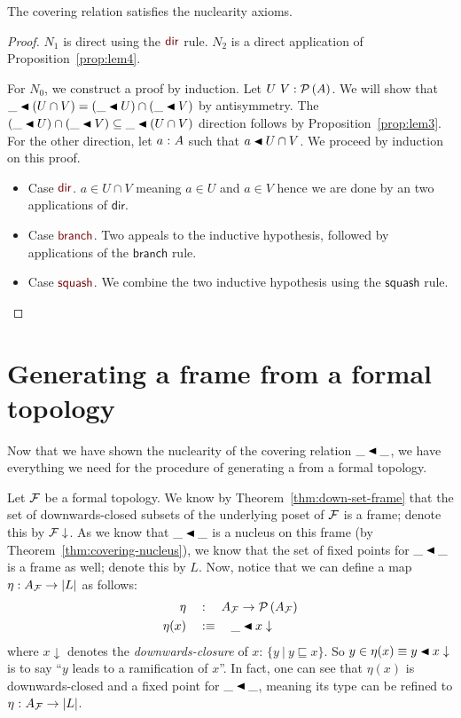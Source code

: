 \begin{thm}\label{thm:covering-nucleus}
  The covering relation satisfies the nuclearity axioms.
\end{thm}
\begin{proof}
  $N_1$ is direct using the $\ruledir{}$ rule. $N_2$ is a direct application of
  Proposition~\ref{prop:lem4}.

  For $N_0$, we construct a proof by induction. Let $U~V:\mathcal{P}\left(A\right)$. We will show
  that $\_ \covernm{} (U \cap V) = (\_ \covernm{} U) \cap (\_ \covernm{} V)$ by antisymmetry. The $(\_ \covernm{} U) \cap
  (\_ \covernm{} V) \subseteq \_ \covernm{} (U \cap V)$ direction follows by Proposition~\ref{prop:lem3}. For the
  other direction, let $a\hspace{0.1mm}:\hspace{0.1mm}A$ such that $a \covernm{} U \cap V$. We proceed by induction on
  this proof.
  \begin{itemize}
    \item Case $\ruledir{}$. $a \in U \cap V$ meaning $a \in U$ and $a \in V$ hence we are done
      by an two applications of $\mathsf{dir}$.
    \item Case $\rulebranch{}$. Two appeals to the inductive hypothesis, followed by
      applications of the $\mathsf{branch}$ rule.
    \item Case $\rulesquash{}$. We combine the two inductive hypothesis using the
      $\mathsf{squash}$ rule.
  \end{itemize}
\end{proof}

\section{Generating a frame from a formal topology}

Now that we have shown the nuclearity of the covering relation $\covers{\_}{\_}$, we have
everything we need for the procedure of generating a \verframe{} from a formal topology.

Let $\mathcal{F}{}$ be a formal topology. We know by Theorem~\ref{thm:down-set-frame} that the
set of downwards-closed subsets of the underlying poset of $\mathcal{F}{}$ is a frame; denote
this by $\mathcal{F}{}\downarrow$. As we know that $\covers{\_}{\_}$ is a nucleus on this frame (by
Theorem~\ref{thm:covering-nucleus}), we know that the set of fixed points for
$\covers{\_}{\_}$ is a frame as well; denote this by $L$. Now, notice that we can define
a map $\eta : A_{\mathcal{F}{}} \rightarrow \left| L \right|$ as follows:
\begin{align*}
  \eta    \quad&:\quad A_{\McF{}} \rightarrow \pow{A_{\McF{}}}\\
  \eta(x) \quad&\is\quad \covers{\_}{x\downarrow}
\end{align*}
where $x\downarrow$ denotes the \emph{downwards-closure} of $x$: $\{ y~|~y \sqsubseteq x \}$. So $y \in \eta(x) \equiv
\covers{y}{x\downarrow}$ is to say ``$y$ leads to a ramification of $x$''. In fact, one can see
that $\eta(x)$ is downwards-closed and a fixed point for $\covers{\_}{\_}$, meaning its type
can be refined to $\eta\hspace{0.1mm}:\hspace{0.1mm}A_{\mathcal{F}{}} \rightarrow \left| L \right|$.


